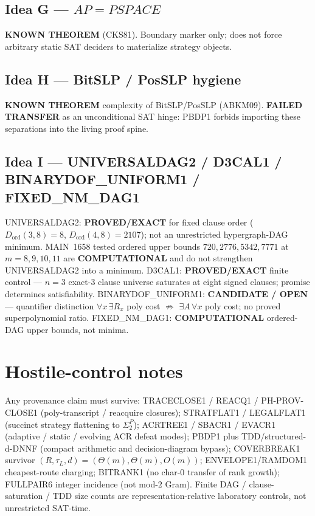 \documentclass[11pt]{article}
\begin{document}
\subsection*{Idea G --- $AP=PSPACE$}
\textbf{KNOWN THEOREM} (CKS81). Boundary marker only; does not force arbitrary
static SAT deciders to materialize strategy objects.

\subsection*{Idea H --- BitSLP / PosSLP hygiene}
\textbf{KNOWN THEOREM} complexity of BitSLP/PosSLP (ABKM09). \textbf{FAILED
TRANSFER} as an unconditional SAT hinge: PBDP1 forbids importing these separations
into the living proof spine.

\subsection*{Idea I --- UNIVERSALDAG2 / D3CAL1 / BINARYDOF\_UNIFORM1 / FIXED\_NM\_DAG1}
UNIVERSALDAG2: \textbf{PROVED/EXACT} for fixed clause order
($D_{\mathrm{ord}}(3,8)=8$, $D_{\mathrm{ord}}(4,8)=2107$); not an unrestricted
hypergraph-DAG minimum. MAIN~1658 tested ordered upper bounds
$720,2776,5342,7771$ at $m=8,9,10,11$ are \textbf{COMPUTATIONAL} and do not
strengthen UNIVERSALDAG2 into a minimum.
D3CAL1: \textbf{PROVED/EXACT} finite control --- $n=3$ exact-3 clause universe
saturates at eight signed clauses; promise determines satisfiability.
BINARYDOF\_UNIFORM1: \textbf{CANDIDATE / OPEN} --- quantifier distinction
$\forall x\,\exists R_x$ poly cost $\not\Rightarrow$ $\exists A\,\forall x$ poly
cost; no proved superpolynomial ratio.
FIXED\_NM\_DAG1: \textbf{COMPUTATIONAL} ordered-DAG upper bounds, not minima.

\section*{Hostile-control notes}
Any provenance claim must survive: TRACECLOSE1 / REACQ1 / PH-PROV-CLOSE1
(poly-transcript / reacquire closures); STRATFLAT1 / LEGALFLAT1 (succinct
strategy flattening to $\Sigma_2^P$); ACRTREE1 / SBACR1 / EVACR1 (adaptive /
static / evolving ACR defeat modes); PBDP1 plus TDD/structured-d-DNNF
(compact arithmetic and decision-diagram bypass); COVERBREAK1 survivor
$(R,\tau_L,d)=(\Theta(m),\Theta(m),O(m))$; ENVELOPE1/RAMDOM1 cheapest-route
charging; BITRANK1 (no char-$0$ transfer of rank growth); FULLPAIR6 integer
incidence (not mod-$2$ Gram). Finite DAG / clause-saturation / TDD size counts
are representation-relative laboratory controls, not unrestricted SAT-time.
\end{document}
